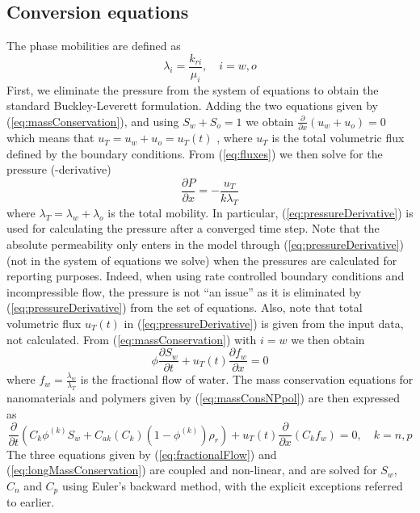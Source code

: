 \documentclass[nanomaterials,article,submit,moreauthors,pdftex]{Definitions/mdpi}
\begin{document}
\subsection{Conversion equations}
The phase mobilities are defined as
\begin{equation}
    \lambda_i = \frac{k_{ri}}{\mu_i}, \quad i=w,o
\end{equation}
First, we eliminate the pressure from the system of equations to obtain the standard Buckley-Leverett formulation. Adding the two equations given by (\ref{eq:massConservation}), and using $S_w+S_o=1$ we obtain $\frac{\partial}{\partial x}(u_w+u_o)=0$  which means that $u_T=u_w+u_o=u_T(t)$  , where $u_T$ is the total volumetric flux defined by the boundary conditions. From (\ref{eq:fluxes}) we then solve for the pressure (-derivative)
\begin{equation} \label{eq:pressureDerivative} %
    \frac{\partial P}{\partial x} = -\frac{u_T}{k\lambda_T}
\end{equation}
where  $\lambda_T=\lambda_w+\lambda_o$ is the total mobility. In particular, (\ref{eq:pressureDerivative}) is used for calculating the pressure after a converged time step. Note that the absolute permeability only enters in the model through (\ref{eq:pressureDerivative}) (not in the system of equations we solve) when the pressures are calculated for reporting purposes. Indeed, when using rate controlled boundary conditions and incompressible flow, the pressure is not “an issue” as it is eliminated by (\ref{eq:pressureDerivative}) from the set of equations. Also, note that total volumetric flux $u_T(t)$ in (\ref{eq:pressureDerivative}) is given from the input data, not calculated. From (\ref{eq:massConservation}) with  $i=w$ we then obtain
\begin{equation} \label{eq:fractionalFlow} %
    \phi\frac{\partial S_w}{\partial t}+u_T(t)\frac{\partial f_w}{\partial x} = 0
\end{equation}
where $f_w=\frac{\lambda_w}{\lambda_T}$ is the fractional flow of water. The mass conservation equations for nanomaterials and polymers given by (\ref{eq:massConsNPpol}) are then expressed as
\begin{equation} \label{eq:longMassConservation} %
    \frac{\partial}{\partial t}\left( C_k\phi^{(k)}S_w + C_{ak}(C_k)(1-\phi^{(k)}) \rho_r \right) + u_T(t) \frac{\partial}{\partial x}(C_k f_w)=0, \quad k=n,p
\end{equation}
The three equations given by (\ref{eq:fractionalFlow}) and (\ref{eq:longMassConservation}) are coupled and non-linear, and are solved for $S_w$, $C_n$ and $C_p$  using Euler’s backward method, with the explicit exceptions referred to earlier.
\end{document}

